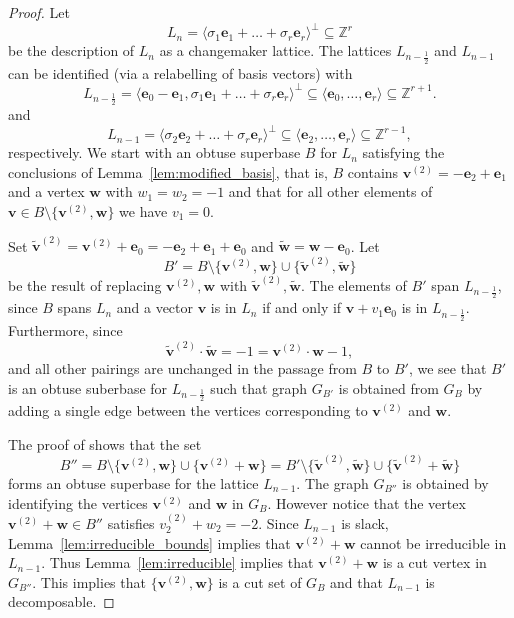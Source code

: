 \documentclass{amsart} %
\newcommand{\Z}{\mathbb{Z}}
\newcommand{\e}{\bm{e}}
\newcommand{\bv}{\bm{v}}
\theoremstyle{thm}
\theoremstyle{definition}
\numberwithin{equation}{section}
\begin{document}
\begin{proof}
    Let
    \[
        L_n=\langle \sigma_1 \e_1+ \dots+ \sigma_r \e_r\rangle^\bot\subseteq \Z^r
    \]
    be the description of $L_n$ as a changemaker lattice. The lattices $L_{n-\frac12}$ and $L_{n-1}$ can be identified (via a relabelling of basis vectors) with
    \[
    L_{n-\frac{1}{2}}=\langle \e_0-\e_1, \sigma_1 \e_1+ \dots+ \sigma_r \e_r\rangle^\bot\subseteq \langle \e_0, \dots, \e_r \rangle \subseteq \Z^{r+1}.
    \]
    and
    \[
    L_{n-1}=\langle \sigma_2 \e_2+ \dots+ \sigma_r \e_r\rangle^\bot\subseteq \langle \e_2, \dots, \e_r \rangle \subseteq \Z^{r-1},
    \]
    respectively.
    We start with an obtuse superbase $B$ for $L_n$ satisfying the conclusions of Lemma~\ref{lem:modified_basis}, that is, $B$ contains $\bv^{(2)}=-\e_2+\e_1$ and a vertex $\bm{w}$ with $w_1=w_2=-1$ and that for all other elements of $\bv\in B\setminus\{\bv^{(2)},\bm{w}\}$ we have $v_1=0$.
    
    Set $\widetilde{\bv}^{(2)}=\bv^{(2)}+\e_0= -\e_2+\e_1+\e_0$ and $\widetilde{\bm{w}}=\bm{w}-\e_0$. Let 
    \[B'=B\setminus\{\bv^{(2)},\bm{w}\}\cup \{\widetilde{\bv}^{(2)},\widetilde{\bm{w}}\}\]
    be the result of replacing $\bv^{(2)},\bm{w}$ with $\widetilde{\bv}^{(2)},\widetilde{\bm{w}}$. The elements of $B'$ span $L_{n-\frac{1}{2}}$, since $B$ spans $L_n$ and a vector $\bv$ is in $L_n$ if and only if $\bv+v_1 \e_0$ is in $L_{n-\frac{1}{2}}$.
    Furthermore, since 
    \[\widetilde{\bv}^{(2)}\cdot \widetilde{\bm{w}}=-1=\bv^{(2)}\cdot \bm{w}-1, \]
    and all other pairings are unchanged in the passage from $B$ to $B'$, we see that $B'$ is an obtuse suberbase for $L_{n-\frac12}$ such that graph $G_{B'}$ is obtained from $G_B$ by adding a single edge between the vertices corresponding to $\bv^{(2)}$ and $\bm{w}$.

    The proof of \cite[Proposition~4.2]{Mc17} shows that the set 
    \[
    B''=B\setminus\{\bv^{(2)},\bm{w}\} \cup \{\bv^{(2)}+\bm{w}\}=B'\setminus \{\widetilde{\bv}^{(2)},\widetilde{\bm{w}}\} \cup \{\widetilde{\bv}^{(2)}+\widetilde{\bm{w}}\}
    \]
    forms an obtuse superbase for the lattice $L_{n-1}$. The graph $G_{B''}$ is obtained by identifying the vertices $\bv^{(2)}$ and $\bm{w}$ in $G_B$. However notice that the vertex $\bv^{(2)}+\bm{w}\in B''$ satisfies  $v_2^{(2)}+w_2=-2$. Since $L_{n-1}$ is slack, Lemma~\ref{lem:irreducible_bounds} implies that $\bv^{(2)}+\bm{w}$ cannot be irreducible in $L_{n-1}$. Thus Lemma~\ref{lem:irreducible} implies that $\bv^{(2)}+\bm{w}$ is a cut vertex in $G_{B''}$. This implies that $\{\bv^{(2)},\bm{w}\}$ is a cut set of $G_B$ and that $L_{n-1}$ is decomposable.


\end{proof}
\end{document}
